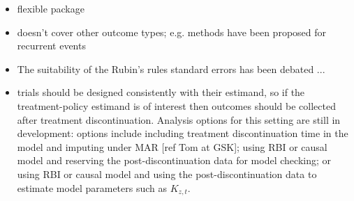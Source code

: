 \begin{itemize}
\item flexible package
\item doesn't cover other outcome types; e.g. methods have been proposed for recurrent events \citep{Keene++14}
\item The suitability of the Rubin's rules standard errors has been debated \cite{ian:Carpenter_letter,Carpenter++14,Cro++19}...
\item trials should be designed consistently with their estimand, so if the treatment-policy estimand is of interest then outcomes should be collected after treatment discontinuation. Analysis options for this setting are still in development: options include including treatment discontinuation time in the model and imputing under MAR [ref Tom at GSK]; using RBI or causal model and reserving the post-discontinuation data for model checking; or using RBI or causal model and using the post-discontinuation data to estimate model parameters such as $K_{z,t}$. 
\end{itemize}

%
%


\address{Ian R White\\
MRC Clinical Trials Unit at UCL\\
90 High Holborn, 2nd Floor, London WC1V 6LJ\\
UK\\
ORCiD: 0000-0002-6718-7661\\
  }

\address{Kevin McGrath\\
MRC Clinical Trials Unit at UCL\\
90 High Holborn, 2nd Floor, London WC1V 6LJ\\
UK\\
  (ORCiD if desired)\\
  }

\address{Matteo Quartagno\\
MRC Clinical Trials Unit at UCL\\
90 High Holborn, 2nd Floor, London WC1V 6LJ\\
UK\\
  (ORCiD if desired)\\
  }

\address{Suzie M Cro\\
Imperial Clinical Trials Unit \\
Imperial College London, 1st Floor, Stadium House
London, W12 7RH\\
  UK\\
  (ORCiD if desired)\\
  }

\address{James Carpenter\\
MRC Clinical Trials Unit at UCL\\
90 High Holborn, 2nd Floor, London WC1V 6LJ\\
UK\\
  (ORCiD if desired)\\
  }
